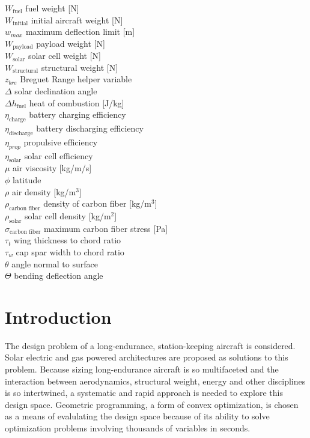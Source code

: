 \documentclass[]{aiaa-tc}%
\begin{document}
\begin{multicols}{2}
\begin{tabbing}
$W_{\text{fuel}}$ \> fuel weight [N] \\
$W_{\text{initial}}$ \> initial aircraft weight [N] \\
$w_{max}$ \> maximum deflection limit [m] \\
$W_{\text{payload}}$ \> payload weight [N] \\
$W_{\text{solar}}$ \> solar cell weight [N] \\
$W_{\text{structural}}$ \> structural weight [N] \\
$z_{bre}$ \> Breguet Range helper variable \\
$\Delta$ \> solar declination angle \\
$\Delta h_{\text{fuel}}$ \> heat of combustion [J/kg] \\
$\eta_{\text{charge}}$ \> battery charging efficiency \\
$\eta_{\text{discharge}}$ \> battery discharging efficiency \\
$\eta_{prop}$ \> propulsive efficiency \\
$\eta_{\text{solar}}$ \> solar cell efficiency \\
$\mu$ \> air viscosity [kg/m/s] \\
$\phi$ \> latitude \\
$\rho$ \> air density [kg/m$^3$] \\
$\rho_{\text{carbon fiber}}$ \> density of carbon fiber [kg/m$^3$] \\
$\rho_{\text{solar}}$ \> solar cell density [kg/m$^2$] \\
$\sigma_{\text{carbon fiber}}$ \> maximum carbon fiber stress [Pa] \\
$\tau_t$ \> wing thickness to chord ratio \\
$\tau_w$ \> cap spar width to chord ratio \\
$\theta$ \> angle normal to surface \\
$\Theta$ \> bending deflection angle 
 \end{tabbing}

\end{multicols}

\section{Introduction}

The design problem of a long-endurance, station-keeping aircraft is considered.
Solar electric and gas powered architectures are proposed as solutions to this problem.
Because sizing long-endurance aircraft is so multifaceted and the interaction between aerodynamics, structural weight, energy and other disciplines is so intertwined, a systematic and rapid approach is needed to explore this design space.
Geometric programming, a form of convex optimization, is chosen as a means of evalulating the design space because of its ability to solve optimization problems involving thousands of variables in seconds.  
\end{document}
